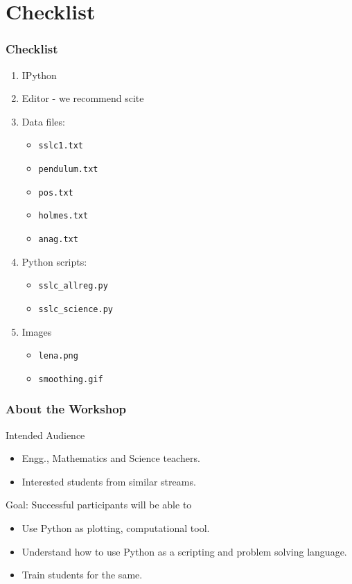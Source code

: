 \documentclass[14pt,compress]{beamer}
\newcommand{\typ}[1]{\lstinline{#1}}
\begin{document}
\section{Checklist}
\begin{frame}
\frametitle{Checklist}
  \begin{enumerate}
    \item IPython
    \item Editor - we recommend \alert{scite}
    \item Data files: 
      \begin{itemize}
      \item \typ{sslc1.txt}
      \item \typ{pendulum.txt}
      \item \typ{pos.txt}
      \item \typ{holmes.txt}
      \item \typ{anag.txt}
      \end{itemize}
    \item Python scripts: 
      \begin{itemize}
      \item \typ{sslc_allreg.py}
      \item \typ{sslc_science.py}
      \end{itemize}
    \item Images
      \begin{itemize}
      \item \typ{lena.png}
      \item \typ{smoothing.gif}
      \end{itemize}
  \end{enumerate}
\end{frame}

\begin{frame}
  \frametitle{About the Workshop}
  \begin{block}{Intended Audience}
  \begin{itemize}
       \item Engg., Mathematics and Science teachers.
       \item Interested students from similar streams.
  \end{itemize}
  \end{block}  

  \begin{block}{Goal: Successful participants will be able to}
    \begin{itemize}
      \item Use Python as plotting, computational tool.
      \item Understand how to use Python as a scripting and problem solving language.
      \item Train students for the same.
    \end{itemize}
  \end{block}
\end{frame}
\end{document}
